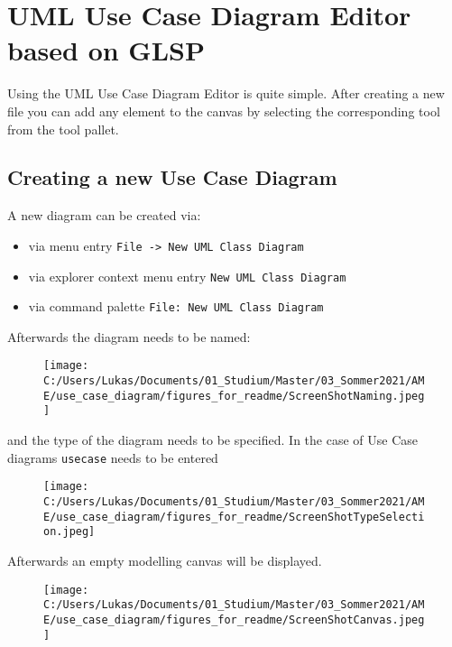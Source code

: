 \documentclass[
]{article}
\author{}
\date{}
\begin{document}
\hypertarget{header-n0}{%
\section{UML Use Case Diagram Editor based on GLSP}\label{header-n0}}

Using the UML Use Case Diagram Editor is quite simple. After creating a
new file you can add any element to the canvas by selecting the
corresponding tool from the tool pallet.

\hypertarget{header-n186}{%
\subsection{Creating a new Use Case Diagram}\label{header-n186}}

A new diagram can be created via:

\begin{itemize}
\item
  via menu entry
  \texttt{File\ -\textgreater{}\ New\ UML\ Class\ Diagram}
\item
  via explorer context menu entry \texttt{New\ UML\ Class\ Diagram}
\item
  via command palette \texttt{File:\ New\ UML\ Class\ Diagram}
\end{itemize}

Afterwards the diagram needs to be named:

\begin{figure}
\centering
\texttt{[image: C:/Users/Lukas/Documents/01\_Studium/Master/03\_Sommer2021/AME/use\_case\_diagram/figures\_for\_readme/ScreenShotNaming.jpeg]}
\caption{}
\end{figure}

and the type of the diagram needs to be specified. In the case of Use
Case diagrams \texttt{usecase} needs to be entered

\begin{figure}
\centering
\texttt{[image: C:/Users/Lukas/Documents/01\_Studium/Master/03\_Sommer2021/AME/use\_case\_diagram/figures\_for\_readme/ScreenShotTypeSelection.jpeg]}
\caption{}
\end{figure}

Afterwards an empty modelling canvas will be displayed.

\begin{figure}
\centering
\texttt{[image: C:/Users/Lukas/Documents/01\_Studium/Master/03\_Sommer2021/AME/use\_case\_diagram/figures\_for\_readme/ScreenShotCanvas.jpeg]}
\caption{}
\end{figure}
\end{document}
